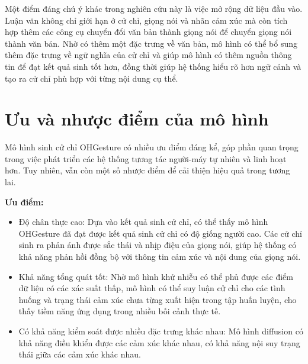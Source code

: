 Một điểm đáng chú ý khác trong nghiên cứu này là việc mở rộng dữ liệu đầu vào. Luận văn không chỉ giới hạn ở cử chỉ, giọng nói và nhãn cảm xúc mà còn tích hợp thêm các công cụ chuyển đổi văn bản thành giọng nói để chuyển giọng nói thành văn bản. Nhờ có thêm một đặc trưng về văn bản, mô hình có thể bổ sung thêm đặc trưng về ngữ nghĩa của cử chỉ và giúp mô hình có thêm nguồn thông tin để đạt kết quả sinh tốt hơn, đồng thời giúp hệ thống hiểu rõ hơn ngữ cảnh và tạo ra cử chỉ phù hợp với từng nội dung cụ thể.




\section{Ưu và nhược điểm của mô hình}


Mô hình sinh cử chỉ OHGesture có nhiều ưu điểm đáng kể, góp phần quan trọng trong việc phát triển các hệ thống tương tác người-máy tự nhiên và linh hoạt hơn. Tuy nhiên, vẫn còn một số nhược điểm để cải thiện hiệu quả trong tương lai.

\vspace{10pt}

\textbf{Ưu điểm:}

\begin{itemize}
	\item Độ chân thực cao: Dựa vào kết quả sinh cử chỉ, có thể thấy mô hình OHGesture đã đạt được kết quả sinh cử chỉ có độ giống người cao. Các cử chỉ sinh ra phản ánh được sắc thái và nhịp điệu của giọng nói, giúp hệ thống có khả năng phản hồi đồng bộ với thông tin cảm xúc và nội dung của giọng nói.
	
	\item Khả năng tổng quát tốt: Nhờ mô hình khử nhiễu có thể phủ được các điểm dữ liệu có các xác suất thấp, mô hình có thể suy luận cử chỉ cho các tình huống và trạng thái cảm xúc chưa từng xuất hiện trong tập huấn luyện, cho thấy tiềm năng ứng dụng trong nhiều bối cảnh thực tế.
	
	\item Có khả năng kiểm soát được nhiều đặc trưng khác nhau: Mô hình diffusion có khả năng điều khiển được các cảm xúc khác nhau, có khả năng nội suy trạng thái giữa các cảm xúc khác nhau.
	
	
	
	\end{itemize}



